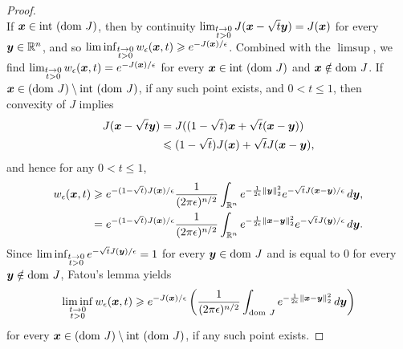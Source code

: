 \begin{proof}
\[\]
If $\boldsymbol{x}\in\mathrm{int~}(\mathrm{dom~} J)$, then by continuity $\lim_{\substack{t\to0\\t>0}}J(\boldsymbol{x}-\sqrt{t}\boldsymbol{y})=J(\boldsymbol{x})$ for every $\boldsymbol{y}\in\mathbb{R}^n$, and so $\liminf_{\substack{t\to0\\t>0}}w_{\epsilon}(\boldsymbol{x},t)\geqslant e^{-J(\boldsymbol{x})/\epsilon}$. Combined with the $\limsup$, we find $\lim_{\substack{t\to0\\t>0}}w_{\epsilon}(\boldsymbol{x},t)=e^{-J(\boldsymbol{x})/\epsilon}$ for every $\boldsymbol{x} \in \mathrm{int~}(\mathrm{dom~} J)$ and $\boldsymbol{x} \notin \mathrm{dom~} J$. If $\boldsymbol{x}\in(\mathrm{dom~} J)\setminus\mathrm{int~}(\mathrm{dom~} J)$, if any such point exists, and $0<t\leqslant1$, then convexity of $J$ implies
\begin{align*}
J(\boldsymbol{x}-\sqrt{t}\boldsymbol{y}) & =J((1-\sqrt{t})\boldsymbol{x}+\sqrt{t}(\boldsymbol{x}-\boldsymbol{y}))\\
& \leqslant(1-\sqrt{t})J(\boldsymbol{x})+\sqrt{t}J(\boldsymbol{x}-\boldsymbol{y}),
\end{align*}
and hence for any $0<t\leqslant1$,
\begin{align*}
w_{\epsilon}(\boldsymbol{x},t) & \geqslant e^{-(1-\sqrt{t})J(\boldsymbol{x})/\epsilon}\frac{1}{(2\pi\epsilon)^{n/2}}\int_{\mathbb{R}^n}e^{-\frac{1}{2\epsilon}\left\Vert \boldsymbol{y}\right\Vert _{2}^{2}}e^{-\sqrt{t}J(\boldsymbol{x}-\boldsymbol{y})/\epsilon}\mathop{}\!d\boldsymbol{y},\\
& =e^{-(1-\sqrt{t})J(\boldsymbol{x})/\epsilon}\frac{1}{(2\pi\epsilon)^{n/2}}\int_{\mathbb{R}^n}e^{-\frac{1}{2\epsilon}\left\Vert \boldsymbol{x}-\boldsymbol{y}\right\Vert _{2}^{2}}e^{-\sqrt{t}J(\boldsymbol{y})/\epsilon}\mathop{}\!d\boldsymbol{y}.
\end{align*}
Since $\liminf_{\substack{t\to0\\t>0}}e^{-\sqrt{t}J(\boldsymbol{y})/\epsilon} = 1$ for every $\boldsymbol{y}\in\mathrm{dom~} J$ and is equal to $0$ for every $\boldsymbol{y}\notin\mathrm{dom~} J$, Fatou's lemma yields
\[
\liminf_{\substack{t\to0\\t>0}}w_{\epsilon}(\boldsymbol{x},t)\geqslant e^{-J(\boldsymbol{x})/\epsilon}\left(\frac{1}{(2\pi\epsilon)^{n/2}}\int_{\mathrm{dom~} J}e^{-\frac{1}{2\epsilon}\left\Vert \boldsymbol{x}-\boldsymbol{y}\right\Vert _{2}^{2}}\mathop{}\!d\boldsymbol{y}\right)
\]
for every $\boldsymbol{x}\in(\mathrm{dom~} J)\setminus\mathrm{int~}(\mathrm{dom~} J)$, if any such point exists.


\end{proof}
